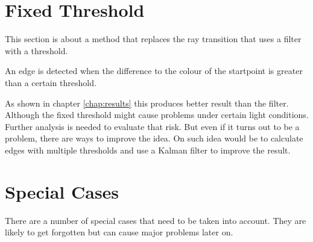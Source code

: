 \section{Fixed Threshold}
\label{sec:fixedThreshold}
This section is about a method that replaces the ray transition that uses a filter with a threshold. 

An edge is detected when the difference to the colour of the startpoint is greater than a certain threshold. 

As shown in chapter \ref{chap:results} this produces better result than the filter. Although the fixed threshold might cause problems under certain light conditions. Further analysis is needed to evaluate that risk. But even if it turns out to be a problem, there are ways to improve the idea. On such idea would be to calculate edges with multiple thresholds and use a Kalman filter to improve the result.
\section{Special Cases}
\label{sec:specialCases}
There are a number of special cases that need to be taken into account. They are likely to get forgotten but can cause major problems later on.

